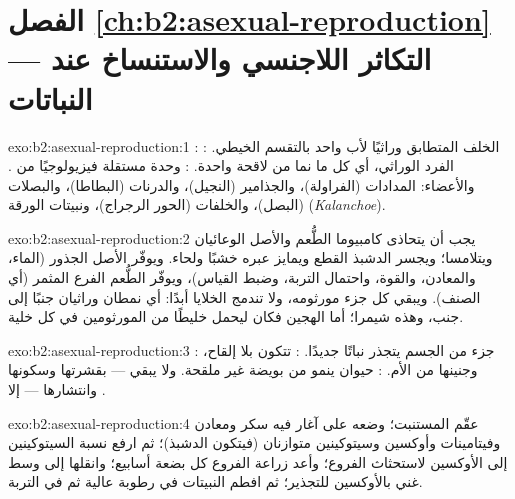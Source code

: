 \section*{الفصل \ref{ch:b2:asexual-reproduction} --- التكاثر اللاجنسي والاستنساخ عند النباتات}

\begin{solution}{exo:b2:asexual-reproduction:1}
: الخلف المتطابق وراثيًا لأب واحد بالتقسم
الخيطي. : الفرد الوراثي، أي كل ما نما من لاقحة
واحدة. : وحدة مستقلة فيزيولوجيًا من . والأعضاء:
المدادات (الفراولة)، والجذامير (النجيل)، والدرنات
(البطاطا)، والبصلات (البصل)، والخلفات (الحور الرجراج)، ونبيتات الورقة
(\emph{Kalanchoe}).
\end{solution}

\begin{solution}{exo:b2:asexual-reproduction:2}
يجب أن يتحاذى كامبيوما الطُّعم والأصل الوعائيان ويتلامسا؛ ويجسر
الدشبذ القطع ويمايز عبره خشبًا ولحاء. ويوفّر الأصل الجذور (الماء،
والمعادن، والقوة، واحتمال التربة، وضبط القياس)، ويوفّر الطُّعم
الفرع المثمر (أي الصنف). ويبقي كل جزء مورثومه، ولا تندمج الخلايا
أبدًا: أي نمطان وراثيان جنبًا إلى جنب، وهذه شيمرا؛ أما الهجين فكان
ليحمل خليطًا من المورثومين في كل خلية.
\end{solution}

\begin{solution}{exo:b2:asexual-reproduction:3}
: جزء من الجسم يتجذر نباتًا جديدًا.
:  تتكون بلا إلقاح، وجنينها  من
الأم. : حيوان ينمو من بويضة غير ملقحة.
ولا يبقي  --- بقشرتها وسكونها وانتشارها --- إلا .
\end{solution}

\begin{solution}{exo:b2:asexual-reproduction:4}
عقّم المستنبت؛ وضعه على آغار فيه سكر ومعادن
وفيتامينات وأوكسين وسيتوكينين متوازنان (فيتكون الدشبذ)؛ ثم ارفع
نسبة السيتوكينين إلى الأوكسين لاستحثاث الفروع؛ وأعد زراعة الفروع
كل بضعة أسابيع؛ وانقلها إلى وسط غني بالأوكسين للتجذير؛ ثم افطم
النبيتات في رطوبة عالية ثم في التربة.
\end{solution}

